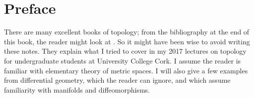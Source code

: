

\vrefwarning
%
\chapter*{Preface}
There are many excellent books of topology; from the bibliography at the end of this book, the reader might look at \cite{MR705632,MR1700700,MR1867354,MR2483686,MR734483,MR2218695,Milnor:1997,MR3728284,MR2313004,MR2233951,MR2155623,MR1679607,MR1384994,MR2456045}.
So it might have been wise to avoid writing these notes. 
They explain what I tried to cover in my 2017 lectures on topology for undergraduate students at University College Cork.
I assume the reader is familiar with elementary theory of metric spaces.
I will also give a few examples from differential geometry, which the reader can ignore, and which assume familiarity with manifolds and diffeomorphisms.
\afterpreface 





